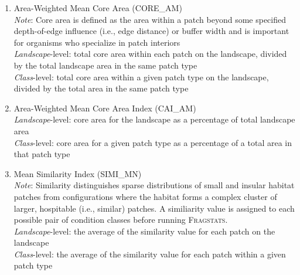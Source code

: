 \begin{itemize}
\begin{enumerate}
		\item Area-Weighted Mean Core Area (CORE\_AM)\\
		\emph{Note}: Core area is defined as the area within a patch beyond some specified depth-of-edge influence (i.e., edge distance) or buffer width and is important for organisms who specialize in patch interiors 	\\
		\emph{Landscape}-level: total core area within each patch on the landscape, divided by the total landscape area in the same patch type	\\
		\emph{Class}-level: total core area within a given patch type on the landscape, divided by the total area in the same patch type	\\
		
		\item Area-Weighted Mean Core Area Index (CAI\_AM)\\
		\emph{Landscape}-level: core area for the landscape as a percentage of total landscape area \\
		\emph{Class}-level: core area for a given patch type as a percentage of a total area in that patch type
		
		\item Mean Similarity Index (SIMI\_MN)\\
		\emph{Note}: Similarity distinguishes sparse distributions of small and insular habitat patches from configurations where the habitat forms a complex cluster of larger, hospitable (i.e., similar) patches. A similiarity value is assigned to each possible pair of condition classes before running \textsc{Fragstats}. 	\\
		\emph{Landscape}-level: the average of the similarity value for each patch on the landscape \\
		\emph{Class}-level: the average of the similarity value for each patch within a given patch type \\
		

\end{enumerate}
\end{itemize}
